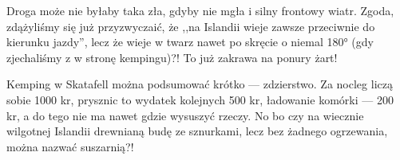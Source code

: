 
Droga może nie byłaby taka zła, gdyby nie mgła i silny frontowy wiatr. Zgoda, zdążyliśmy się już przyzwyczaić, że ,,na Islandii wieje zawsze przeciwnie do kierunku jazdy'', lecz że wieje w twarz nawet po skręcie o niemal 180° (gdy zjechaliśmy z  w stronę kempingu)?! To już zakrawa na ponury żart!

Kemping w Skatafell można podsumować krótko --- zdzierstwo. Za nocleg liczą sobie 1000 kr, prysznic to wydatek kolejnych 500 kr, ładowanie komórki --- 200 kr, a do tego nie ma nawet gdzie wysuszyć rzeczy. No bo czy na wiecznie wilgotnej Islandii drewnianą budę ze sznurkami, lecz bez żadnego ogrzewania, można nazwać suszarnią?!
